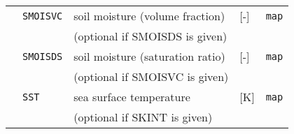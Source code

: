 {\begin{table}[bth]
\begin{center}
\begin{tabularx}{150mm}{rl|l|l|l}
$$             &\verb|SMOISVC| & soil moisture (volume fraction)  & [-]            & \verb|map|         \\
             &               & (optional if SMOISDS is given)   &                &                    \\
             &\verb|SMOISDS| & soil moisture (saturation ratio) & [-]            & \verb|map|         \\
             &               & (optional if SMOISVC is given)   &                &                    \\
             &\verb|SST|     & sea surface temperature          & [K]            & \verb|map|         \\
             &               & (optional if SKINT is given)     &                &                    \\\hline
\end{tabularx}
\end{center}
\end{table}
}
